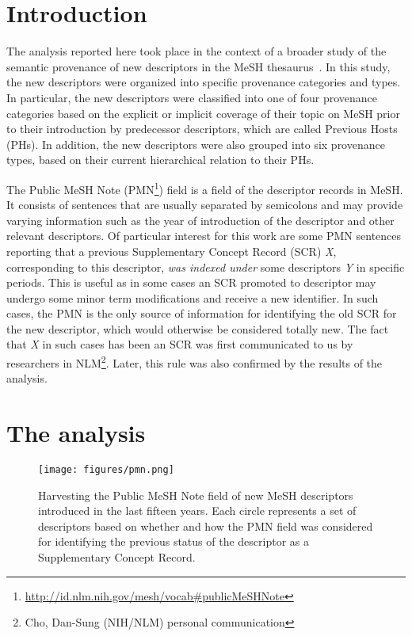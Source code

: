 \section{Introduction}

The analysis reported here took place in the context of a broader study of the semantic provenance of new descriptors in the MeSH thesaurus~\cite{nentidis2021all}. 
In this study, the new descriptors were organized into specific provenance categories and types. In particular, the new descriptors were classified into one of four provenance categories based on the explicit or implicit coverage of their topic on MeSH prior to their introduction by predecessor descriptors, which are called Previous Hosts (PHs).  
In addition, the new descriptors were also grouped into six provenance types, based on their current hierarchical relation to their PHs. 

The Public MeSH Note (PMN\footnote{\url{http://id.nlm.nih.gov/mesh/vocab\#publicMeSHNote}}) field is a field of the descriptor records in MeSH. It consists of sentences that are usually separated by semicolons and may provide varying information such as the year of introduction of the descriptor and other relevant descriptors. 
Of particular interest for this work are some PMN sentences reporting that a previous Supplementary Concept Record (SCR) \textit{X}, corresponding to this descriptor, \textit{was indexed under} some descriptors \textit{Y} in specific periods. This is useful as in some cases an SCR promoted to descriptor may undergo some minor term modifications and receive a new identifier. In such cases, the PMN is the only source of information for identifying the old SCR for the new descriptor, which would otherwise be considered totally new. The fact that \textit{X} in such cases has been an SCR was first communicated to us by researchers in NLM\footnote{Cho, Dan-Sung (NIH/NLM) personal communication}. Later, this rule was also confirmed by the results of the analysis.

\section{The analysis}

\begin{figure*}    
\center
\texttt{[image: figures/pmn.png]}
\caption{Harvesting the Public MeSH Note field of new MeSH descriptors introduced in the last fifteen years. Each circle represents a set of descriptors based on whether and how the PMN field was considered for identifying the previous status of the descriptor as a Supplementary Concept Record. }
\label{fig:pmn}       %
\end{figure*}

